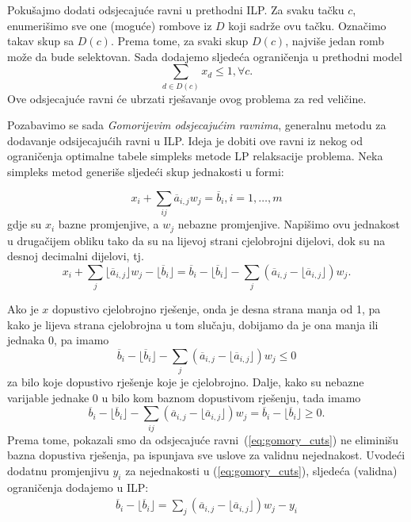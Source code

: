 \documentclass[a4paper, utf8, 11pt, colorlinks]{book}
\begin{document}
Pokušajmo dodati odsjecajuće ravni u prethodni ILP. Za svaku tačku $c$, enumerišimo sve one (moguće) rombove iz $D$ koji sadrže ovu tačku. Označimo takav skup sa $D(c)$. Prema tome, za svaki skup $D(c)$, najviše jedan romb može da bude selektovan. Sada dodajemo sljedeća ograničenja u prethodni model
\begin{equation}
     \sum_{d \in D(c)} x_d \leq 1, \forall c.
\end{equation}
Ove odsjecajuće ravni će ubrzati rješavanje ovog problema za   red veličine.

Pozabavimo se sada \emph{Gomorijevim odsjecajućim ravnima}, generalnu metodu za dodavanje odsijecajućih ravni u ILP.  Ideja je dobiti ove ravni iz nekog od ograničenja optimalne tabele simpleks metode LP relaksacije problema. Neka simpleks metod generiše sljedeći skup jednakosti u formi:

$$x_i + \sum_{ij} \overline{a}_{i,j} w_j= \overline{b}_i, i=1, \ldots,m$$
gdje su $x_i$ bazne promjenjive, a $w_j$ nebazne promjenjive. Napišimo ovu jednakost u drugačijem obliku tako da su na lijevoj strani cjelobrojni dijelovi, dok su na desnoj decimalni dijelovi, tj.
$$x_i + \sum_{j} \lfloor \overline{a}_{i,j} \rfloor w_j - \lfloor \overline{b}_i \rfloor = \overline{b}_i - \lfloor \overline{b}_i  \rfloor    - \sum_{j} (\overline{a}_{i,j} - \lfloor \overline{a}_{i,j} \rfloor) w_j.$$

Ako je $x$ dopustivo cjelobrojno rješenje, onda je desna strana manja od 1, pa kako je lijeva strana cjelobrojna u tom slučaju, dobijamo da je ona manja ili jednaka 0, pa imamo
\begin{equation}\label{eq:gomory_cuts}
    \overline{b}_i - \lfloor \overline{b}_i  \rfloor    - \sum_{j} (\overline{a}_{i,j} - \lfloor \overline{a}_{i,j} \rfloor) w_j \leq 0
\end{equation}
za bilo koje dopustivo rješenje koje je cjelobrojno. Dalje, kako su nebazne varijable jednake 0 u bilo kom baznom dopustivom rješenju, tada imamo 
$$ \overline{b}_i - \lfloor \overline{b}_i  \rfloor    - \sum_{ij} (\overline{a}_{i,j} - \lfloor \overline{a}_{i,j} \rfloor) w_j = \overline{b}_i - \lfloor \overline{b}_i \rfloor  \geq 0.$$
Prema tome, pokazali smo da odsjecajuće ravni~(\ref{eq:gomory_cuts}) ne eliminišu bazna dopustiva rješenja, pa ispunjava sve uslove za validnu nejednakost. Uvodeći dodatnu promjenjivu $y_i$ za nejednakosti u (\ref{eq:gomory_cuts}), sljedeća (validna) ograničenja dodajemo u ILP:
\begin{align}\label{gomory_cplex}
       \overline{b}_i - \lfloor \overline{b}_i \rfloor=   \sum_{j} (\overline{a}_{i,j} - \lfloor \overline{a}_{i,j} \rfloor) w_j - y_i 
\end{align}
\end{document}
